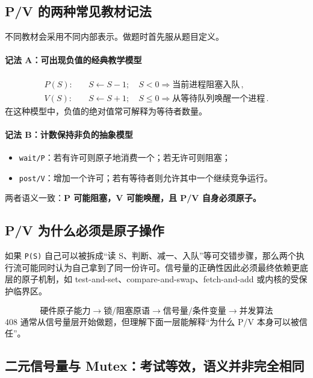 \documentclass[11pt,a4paper]{ctexart}
\newcommand{\kw}[1]{\textbf{#1}}
\newcommand{\code}[1]{\texttt{#1}}
\begin{document}
\subsection{P/V 的两种常见教材记法}

不同教材会采用不同内部表示。做题时首先服从题目定义。

\paragraph{记法 A：可出现负值的经典教学模型}
\begin{align*}
P(S):&\quad S\leftarrow S-1;\quad S<0\Rightarrow\text{当前进程阻塞入队}\,,\\
V(S):&\quad S\leftarrow S+1;\quad S\le 0\Rightarrow\text{从等待队列唤醒一个进程}\,.
\end{align*}
在这种模型中，负值的绝对值常可解释为等待者数量。

\paragraph{记法 B：计数保持非负的抽象模型}
\begin{itemize}
\item \code{wait/P}：若有许可则原子地消费一个；若无许可则阻塞；
\item \code{post/V}：增加一个许可；若有等待者则允许其中一个继续竞争运行。
\end{itemize}

两者语义一致：\kw{P 可能阻塞，V 可能唤醒，且 P/V 自身必须原子。}

\subsection{P/V 为什么必须是原子操作}

如果 \code{P(S)} 自己可以被拆成“读 S、判断、减一、入队”等可交错步骤，那么两个执行流可能同时认为自己拿到了同一份许可。信号量的正确性因此必须最终依赖更底层的原子机制，如 test-and-set、compare-and-swap、fetch-and-add 或内核的受保护临界区。

\begin{pattern}[抽象层次]
\[
\boxed{
\text{硬件原子能力}
\to\text{锁/阻塞原语}
\to\text{信号量/条件变量}
\to\text{并发算法}
}
\]
408 通常从信号量层开始做题，但理解下面一层能解释“为什么 P/V 本身可以被信任”。
\end{pattern}

\subsection{二元信号量与 Mutex：考试等效，语义并非完全相同}
\end{document}
